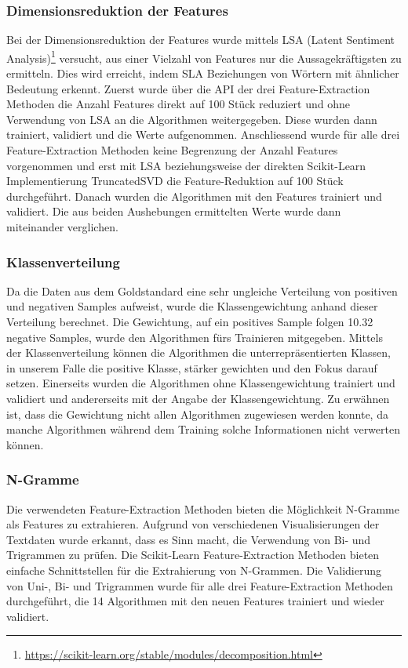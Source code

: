 \subsubsection{Dimensionsreduktion der Features}
Bei der Dimensionsreduktion der Features wurde mittels LSA (Latent Sentiment Analysis)\footnote{\url{https://scikit-learn.org/stable/modules/decomposition.html}} versucht, aus einer Vielzahl von Features nur die Aussagekräftigsten zu ermitteln.
Dies wird erreicht, indem SLA Beziehungen von Wörtern mit ähnlicher Bedeutung erkennt.
Zuerst wurde über die API der drei Feature-Extraction Methoden die Anzahl Features direkt auf 100 Stück reduziert und ohne Verwendung von LSA an die Algorithmen weitergegeben.
Diese wurden dann trainiert, validiert und die Werte aufgenommen.
Anschliessend wurde für alle drei Feature-Extraction Methoden keine Begrenzung der Anzahl Features vorgenommen und erst mit LSA beziehungsweise der direkten Scikit-Learn Implementierung \glqq TruncatedSVD\grqq{} die Feature-Reduktion auf 100 Stück durchgeführt.
Danach wurden die Algorithmen mit den Features trainiert und validiert.
Die aus beiden Aushebungen ermittelten Werte wurde dann miteinander verglichen.
\subsubsection{Klassenverteilung}
Da die Daten aus dem Goldstandard eine sehr ungleiche Verteilung von positiven und negativen Samples aufweist, wurde die Klassengewichtung anhand dieser Verteilung berechnet.
Die Gewichtung, auf ein positives Sample folgen 10.32 negative Samples, wurde den Algorithmen fürs Trainieren mitgegeben.
Mittels der Klassenverteilung können die Algorithmen die unterrepräsentierten Klassen, in unserem Falle die positive Klasse, stärker gewichten und den Fokus darauf setzen.
Einerseits wurden die Algorithmen ohne Klassengewichtung trainiert und validiert und andererseits mit der Angabe der Klassengewichtung.
Zu erwähnen ist, dass die Gewichtung nicht allen Algorithmen zugewiesen werden konnte, da manche Algorithmen während dem Training solche Informationen nicht verwerten können.
\subsubsection{N-Gramme}
Die verwendeten Feature-Extraction Methoden bieten die Möglichkeit N-Gramme als Features zu extrahieren.
Aufgrund von verschiedenen Visualisierungen der Textdaten wurde erkannt, dass es Sinn macht, die Verwendung von Bi- und Trigrammen zu prüfen.
Die Scikit-Learn Feature-Extraction Methoden bieten einfache Schnittstellen für die Extrahierung von N-Grammen.
Die Validierung von Uni-, Bi- und Trigrammen wurde für alle drei Feature-Extraction Methoden durchgeführt, die 14 Algorithmen mit den neuen Features trainiert und wieder validiert.
